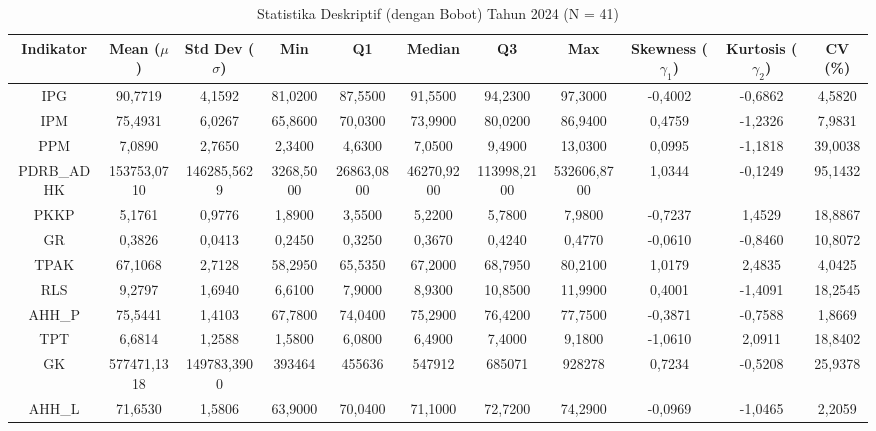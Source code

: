\begin{table}[H]
\centering
\caption{Statistika Deskriptif (dengan Bobot) Tahun 2024 (N = 41)} \label{tab:app1desc_2024}
\begin{adjustbox}{max width=\textwidth, max height=0.85\textheight}
\begin{tabular}{|c|c|c|c|c|c|c|c|c|c|c|}
\hline
\textbf{Indikator} & \textbf{Mean ($\mu$)} & \textbf{Std Dev ($\sigma$)} & \textbf{Min} & \textbf{Q1} & \textbf{Median} & \textbf{Q3} & \textbf{Max} & \textbf{Skewness ($\gamma_1$)} & \textbf{Kurtosis ($\gamma_2$)} & \textbf{CV (\%)} \\
\hline
IPG & 90,7719 & 4,1592 & 81,0200 & 87,5500 & 91,5500 & 94,2300 & 97,3000 & -0,4002 & -0,6862 & 4,5820 \\
IPM & 75,4931 & 6,0267 & 65,8600 & 70,0300 & 73,9900 & 80,0200 & 86,9400 & 0,4759 & -1,2326 & 7,9831 \\
PPM & 7,0890 & 2,7650 & 2,3400 & 4,6300 & 7,0500 & 9,4900 & 13,0300 & 0,0995 & -1,1818 & 39,0038 \\
PDRB\_ADHK & 153753,0710 & 146285,5629 & 3268,5000 & 26863,0800 & 46270,9200 & 113998,2100 & 532606,8700 & 1,0344 & -0,1249 & 95,1432 \\
PKKP & 5,1761 & 0,9776 & 1,8900 & 3,5500 & 5,2200 & 5,7800 & 7,9800 & -0,7237 & 1,4529 & 18,8867 \\
GR & 0,3826 & 0,0413 & 0,2450 & 0,3250 & 0,3670 & 0,4240 & 0,4770 & -0,0610 & -0,8460 & 10,8072 \\
TPAK & 67,1068 & 2,7128 & 58,2950 & 65,5350 & 67,2000 & 68,7950 & 80,2100 & 1,0179 & 2,4835 & 4,0425 \\
RLS & 9,2797 & 1,6940 & 6,6100 & 7,9000 & 8,9300 & 10,8500 & 11,9900 & 0,4001 & -1,4091 & 18,2545 \\
AHH\_P & 75,5441 & 1,4103 & 67,7800 & 74,0400 & 75,2900 & 76,4200 & 77,7500 & -0,3871 & -0,7588 & 1,8669 \\
TPT & 6,6814 & 1,2588 & 1,5800 & 6,0800 & 6,4900 & 7,4000 & 9,1800 & -1,0610 & 2,0911 & 18,8402 \\
GK & 577471,1318 & 149783,3900 & 393464 & 455636 & 547912 & 685071 & 928278 & 0,7234 & -0,5208 & 25,9378 \\
AHH\_L & 71,6530 & 1,5806 & 63,9000 & 70,0400 & 71,1000 & 72,7200 & 74,2900 & -0,0969 & -1,0465 & 2,2059 \\
\hline
\end{tabular}
\end{adjustbox}
\end{table}